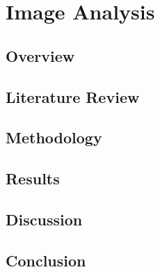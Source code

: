 \chapter{Image Analysis}
\section{Overview}
\section{Literature Review}
\section{Methodology}
\section{Results}
\section{Discussion}
\section{Conclusion}